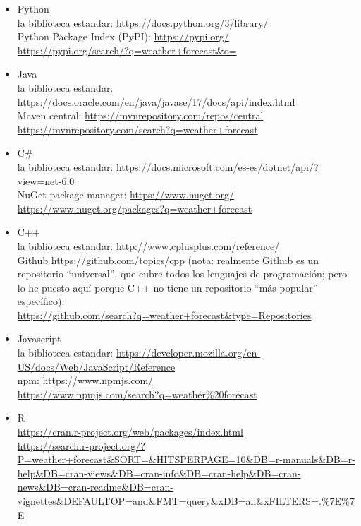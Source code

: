\documentclass[spanish,12pt,a4paper,final,oneside]{book}
\begin{document}
\begin{itemize}

\item Python
\\ la biblioteca estandar: \url{https://docs.python.org/3/library/}
\\ Python Package Index (PyPI): \url{https://pypi.org/} 
\\ {\footnotesize \url{https://pypi.org/search/?q=weather+forecast&o=}}

\item Java
\\ la biblioteca estandar: \url{https://docs.oracle.com/en/java/javase/17/docs/api/index.html}
\\ Maven central: \url{https://mvnrepository.com/repos/central}
\\ {\footnotesize \url{https://mvnrepository.com/search?q=weather+forecast}}

\item C\#
\\ la biblioteca estandar: \url{https://docs.microsoft.com/es-es/dotnet/api/?view=net-6.0}
\\ NuGet package manager: \url{https://www.nuget.org/}
\\ {\footnotesize \url{https://www.nuget.org/packages?q=weather+forecast}}

\item C++
\\ la biblioteca estandar: \url{http://www.cplusplus.com/reference/}
\\ Github \url{https://github.com/topics/cpp} (nota: realmente Github es un repositorio ``universal'', que cubre todos los lenguajes de programación; pero lo he puesto aquí porque C++ no tiene un repositorio ``más popular'' específico).
\\ {\footnotesize \url{https://github.com/search?q=weather+forecast&type=Repositories}}

\item Javascript
\\ la biblioteca estandar: \url{https://developer.mozilla.org/en-US/docs/Web/JavaScript/Reference}
\\ npm: \url{https://www.npmjs.com/}
\\ {\footnotesize \url{https://www.npmjs.com/search?q=weather%20forecast}}

\item R
\\ \url{https://cran.r-project.org/web/packages/index.html}
\\ {\scriptsize \url{https://search.r-project.org/?P=weather+forecast&SORT=&HITSPERPAGE=10&DB=r-manuals&DB=r-help&DB=cran-views&DB=cran-info&DB=cran-help&DB=cran-news&DB=cran-readme&DB=cran-vignettes&DEFAULTOP=and&FMT=query&xDB=all&xFILTERS=.%7E%7E}}


\end{itemize}
\end{document}
